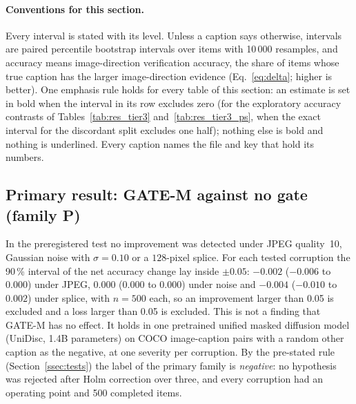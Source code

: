 
\paragraph{Conventions for this section.}
Every interval is stated with its level.
Unless a caption says otherwise, intervals are paired percentile bootstrap intervals over items with 10\,000 resamples, and accuracy
means image-direction verification accuracy, the share of items whose true caption has the larger image-direction evidence
(Eq.~\eqref{eq:delta}; higher is better).
One emphasis rule holds for every table of this section: an estimate is set in bold when the interval in its row excludes zero (for the
exploratory accuracy contrasts of Tables~\ref{tab:res_tier3} and~\ref{tab:res_tier3_ps}, when the exact interval for the discordant
split excludes one half); nothing else is bold and nothing is underlined.
Every caption names the file and key that hold its numbers.

\subsection{Primary result: GATE-M against no gate (family P)}\label{ssec:res_primary}
In the preregistered test no improvement was detected under JPEG quality~10, Gaussian noise with $\sigma=0.10$ or a $128$-pixel splice.
For each tested corruption the 90\,\% interval of the net accuracy change lay inside $\pm0.05$: $-0.002$ ($-0.006$ to $0.000$) under
JPEG, $0.000$ ($0.000$ to $0.000$) under noise and $-0.004$ ($-0.010$ to $0.002$) under splice, with $n=500$ each, so an improvement
larger than 0.05 is excluded and a loss larger than 0.05 is excluded.
This is not a finding that GATE-M has no effect.
It holds in one pretrained unified masked diffusion model (UniDisc, 1.4B parameters) on COCO image-caption pairs with a random other
caption as the negative, at one severity per corruption.
By the pre-stated rule (Section~\ref{ssec:tests}) the label of the primary family is \emph{negative}: no hypothesis was rejected after
Holm correction over three, and every corruption had an operating point and 500 completed items.

